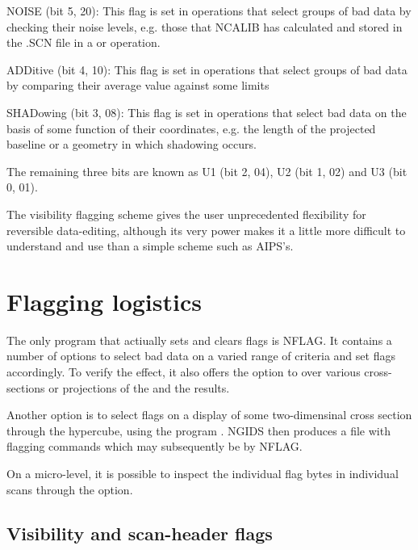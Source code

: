 \item   NOISE (bit 5, 20):  This flag is set in operations that select groups
of bad data by checking their noise levels, e.g. those that NCALIB has
calculated and stored in the .SCN file in a  or
 operation.

\item   ADDitive (bit 4, 10):  This flag is set in operations that select
groups of bad data by comparing their average value against some limits

\item   SHADowing (bit 3, 08):  This flag is set in operations that select bad
data on the basis of some function of their coordinates, e.g. the length of the
projected baseline or a geometry in which shadowing occurs.

\ei
The remaining three bits are known as U1 (bit 2, 04), U2 (bit 1, 02) and U3
(bit 0, 01).

	The \NEWSTAR visibility flagging scheme gives the user unprecedented
flexibility for reversible data-editing, although its very power makes it a
little more difficult to understand and use than a simple scheme such as AIPS's.


\section{ Flagging logistics}
\label{.logistics}

	The only program that actiually sets and clears flags is NFLAG. It
contains a number of options to select bad data on a varied range of criteria
and set flags accordingly. To verify the effect, it also offers the option to
 over various cross-sections or projections of the
 and  the
results.

	Another option is to select flags on a display of some two-dimensinal
cross section through the hypercube, using the program .
NGIDS then produces a file with flagging commands which may subsequently be
 by NFLAG.

	On a micro-level, it is possible to inspect the individual flag bytes
in individual scans through the  option.


\subsection{ Visibility and scan-header flags}
\label{.header.flags}

